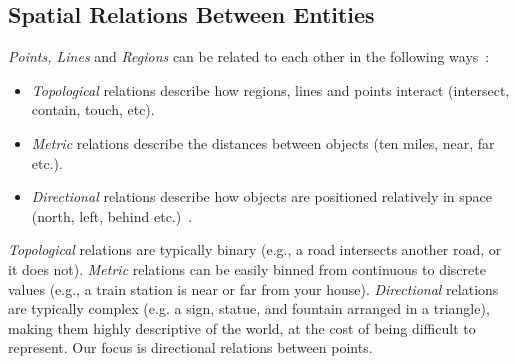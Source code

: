 \subsection{Spatial Relations Between Entities}
\par{
     \textit{Points, Lines} and \textit{Regions} can be related to each other in the following ways~\cite{Carniel2020,Bertella2022,Carniel2023}:
    \begin{itemize}
        \item \textit{Topological} relations describe how regions, lines and points interact (intersect, contain, touch, etc).
        \item \textit{Metric} relations describe the distances between objects (ten miles, near, far etc.).
        \item \textit{Directional} relations describe how objects are positioned relatively in space (north, left, behind etc.)~\cite{Carniel2020,Bertella2022,Carniel2023}.
    \end{itemize}

    \textit{Topological} relations are typically binary (e.g., a road intersects another road, or it does not). 
    \textit{Metric} relations can be easily binned from continuous to discrete values (e.g., a train station is near or far from your house).
    \textit{Directional} relations are typically complex (e.g. a sign, statue, and fountain arranged in a triangle), making them highly descriptive of the world, at the cost of being difficult to represent.
    Our focus is directional relations between points. 
}

